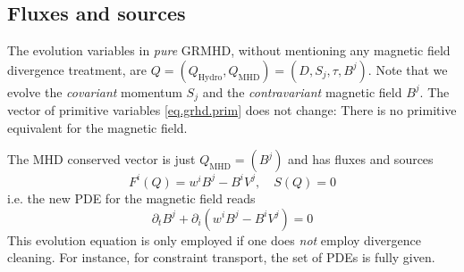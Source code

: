 \documentclass[a4paper]{article}
\newcommand{\hydro}{\text{Hydro}}
\newcommand{\mhd}{\text{MHD}}
\begin{document}
\subsection{Fluxes and sources}
The evolution variables in \emph{pure} GRMHD, without mentioning any
magnetic field divergence treatment, are 
$Q = (Q_\hydro, Q_\mhd) = (D, S_j, \tau, B^j)$.
Note that we evolve the \emph{covariant} momentum $S_j$ and the
\emph{contravariant} magnetic field $B^j$. The vector of primitive
variables \eqref{eq.grhd.prim} does not change: There is no primitive
equivalent for the magnetic field.

The MHD conserved vector is just $Q_\mhd=(B^j)$ and has fluxes and sources
\begin{equation}
F^i(Q) = w^i B^j - B^i V^j,
\quad S(Q) = 0
\end{equation}
i.e. the new PDE for the magnetic field reads
\begin{equation}\label{eq.grmhd.pdeb.simple}
\partial_t B^j + \partial_i (w^i B^j - B^i V^j) = 0
\end{equation}
This evolution equation is only employed if one does \emph{not} employ
divergence cleaning. For instance, for constraint transport, the set
of PDEs is fully given.

%
%
\end{document}
